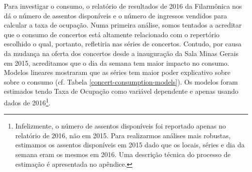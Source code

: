 \documentclass[a4paper, 12pt, openright, oneside, german, french, english, brazil]{abntex2}
\begin{document}
	Para investigar o consumo, o relatório de resultados de 2016 da Filarmônica nos dá o número de assentos disponíveis e o número de ingressos vendidos para calcular a taxa de ocupação. Numa primeira análise, somos tentados a acreditar que o consumo de concertos está altamente relacionado com o repertório escolhido o qual, portanto, refletiria nas séries de concertos. Contudo, por causa da mudança na oferta dos concertos desde a inauguração da Sala Minas Gerais em 2015, acreditamos que o dia da semana tem maior impacto no consumo. Modelos lineares mostraram que as séries tem maior poder explicativo sobre sobre o consumo (cf. Tabela \ref{concert-consumption-models}). Os modelos foram estimados tendo Taxa de Ocupação como variável dependente e apenas usando dados de 2016\footnote{Infelizmente, o número de assentos disponíveis foi reportado apenas no relatório de 2016, não em 2015. Para realizarmos análises mais robustas, estimamos os assentos disponíveis em 2015 dado que os locais, séries e dia da semana eram os mesmos em 2016. Uma descrição técnica do processo de estimação é apresentada no apêndice.}.
\end{document}
